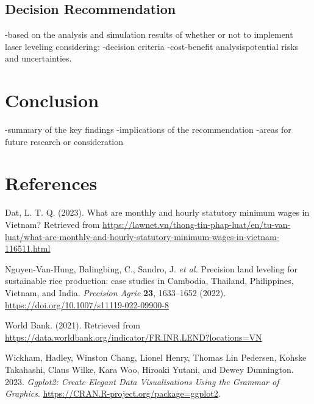 \documentclass[
]{article}
\newlength{\cslhangindent}
\newlength{\cslentryspacingunit} %
\newenvironment{CSLReferences}[2] %
 {%
  \setlength{\parindent}{0pt}
  \ifodd #1
  \let\oldpar\par
  \def\par{\hangindent=\cslhangindent\oldpar}
  \fi
  \setlength{\parskip}{#2\cslentryspacingunit}
 }%
 {}
\begin{document}
\hypertarget{decision-recommendation}{%
\subsection{Decision Recommendation}\label{decision-recommendation}}

-based on the analysis and simulation results of whether or not to
implement laser leveling considering: -decision criteria -cost-benefit
analysispotential risks and uncertainties.

\hypertarget{conclusion}{%
\section{Conclusion}\label{conclusion}}

-summary of the key findings -implications of the recommendation -areas
for future research or consideration

\hypertarget{references}{%
\section{References}\label{references}}

Dat, L. T. Q. (2023). What are monthly and hourly statutory minimum
wages in Vietnam? Retrieved from
\url{https://lawnet.vn/thong-tin-phap-luat/en/tu-van-luat/what-are-monthly-and-hourly-statutory-minimum-wages-in-vietnam-116511.html}

Nguyen-Van-Hung, Balingbing, C., Sandro, J. \emph{et al.} Precision land
leveling for sustainable rice production: case studies in Cambodia,
Thailand, Philippines, Vietnam, and India. \emph{Precision Agric}
\textbf{23}, 1633--1652 (2022).
\url{https://doi.org/10.1007/s11119-022-09900-8}

World Bank. (2021). Retrieved from
\url{https://data.worldbank.org/indicator/FR.INR.LEND?locations=VN}

\hypertarget{refs}{}
\begin{CSLReferences}{1}{0}
\leavevmode{}%
Wickham, Hadley, Winston Chang, Lionel Henry, Thomas Lin Pedersen,
Kohske Takahashi, Claus Wilke, Kara Woo, Hiroaki Yutani, and Dewey
Dunnington. 2023. \emph{Ggplot2: Create Elegant Data Visualisations
Using the Grammar of Graphics}.
\url{https://CRAN.R-project.org/package=ggplot2}.

\end{CSLReferences}
\end{document}
